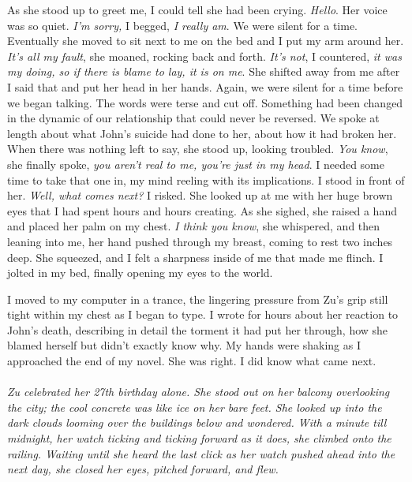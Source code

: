 	As she stood up to greet me, I could tell she had been crying. \textit{Hello}. Her voice was so quiet. \textit{I’m sorry,} I begged, \textit{I really am}. We were silent for a time. Eventually she moved to sit next to me on the bed and I put my arm around her. \textit{It’s all my fault}, she moaned, rocking back and forth. \textit{It’s not}, I countered, \textit{it was my doing, so if there is blame to lay, it is on me}. She shifted away from me after I said that and put her head in her hands. Again, we were silent for a time before we began talking. The words were terse and cut off. Something had been changed in the dynamic of our relationship that could never be reversed. We spoke at length about what John’s suicide had done to her, about how it had broken her. When there was nothing left to say, she stood up, looking troubled. \textit{You know}, she finally spoke, \textit{you aren’t real to me, you’re just in my head}. I needed some time to take that one in, my mind reeling with its implications. I stood in front of her. \textit{Well, what comes next? }I risked. She looked up at me with her huge brown eyes that I had spent hours and hours creating. As she sighed, she raised a hand and placed her palm on my chest. \textit{I think you know}, she whispered, and then leaning into me, her hand pushed through my breast, coming to rest two inches deep. She squeezed, and I felt a sharpness inside of me that made me flinch. I jolted in my bed, finally opening my eyes to the world. 
	
	I moved to my computer in a trance, the lingering pressure from Zu’s grip still tight within my chest as I began to type. I wrote for hours about her reaction to John’s death, describing in detail the torment it had put her through, how she blamed herself but didn’t exactly know why. My hands were shaking as I approached the end of my novel. She was right. I did know what came next.
\\\\
\textit{Zu celebrated her 27th birthday alone. She stood out on her balcony overlooking the city; the cool concrete was like ice on her bare feet. She looked up into the dark clouds looming over the buildings below and wondered. With a minute till midnight, her watch ticking and ticking forward as it does, she climbed onto the railing. Waiting until she heard the last click as her watch pushed ahead into the next day, she closed her eyes, pitched forward, and flew.}
